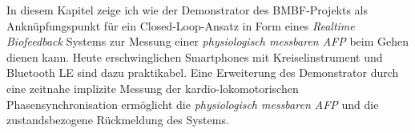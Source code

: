 \label{sec:zussemfassung}

In diesem Kapitel zeige ich wie der Demonstrator des \acs{BMBF}-Projekts als Anknüpfungspunkt für ein Closed-Loop-Ansatz in Form eines \emph{Realtime Biofeedback} Systems zur Messung einer \emph{physiologisch messbaren AFP} beim Gehen dienen kann. Heute erschwinglichen Smartphones mit Kreiselinstrument und Bluetooth LE sind dazu praktikabel. Eine Erweiterung des Demonstrator durch eine zeitnahe implizite Messung der kardio-lokomotorischen Phasensynchronisation ermöglicht die \emph{physiologisch messbaren AFP} und die zustandsbezogene Rückmeldung des Systems.

